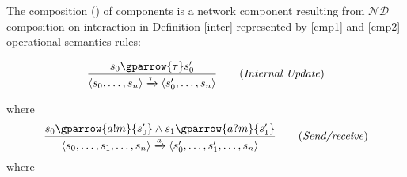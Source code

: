 \begin{mydef}[Composition]\label{def:composition} The composition \emath{\gamma} () of   components is a network component resulting from \(\mathcal{ND}\) composition on interaction  in Definition \ref{inter} represented by \ref{cmp1}  and \ref{cmp2} operational semantics rules:
\begin{boxD}
   \begin{equation}\frac{ s_{0} \gparrow{\tau} s'_{0}} { \langle s_{0},\ldots,s_{n}\rangle \xrightarrow{\tau}\langle s'_{0},\ldots,s_{n}\rangle  } \label{cmp1} \tag{\emph{Internal Update}} 
   \end{equation}
   
   where   
   \begin{equation}\frac{ s_{0} \gparrow{a!m} {s'_{0}} \wedge s_{1} \gparrow{a?m} {s'_{1}} } { \langle s_{0},\ldots, s_{1}, \ldots,s_{n}\rangle \xrightarrow{a}\langle s'_{0},\ldots, s'_{1},\ldots,s_{n}\rangle  } \label{cmp2} \tag{\emph{Send/receive}} \end{equation}
              where   
              \end{boxD}
\end{mydef}